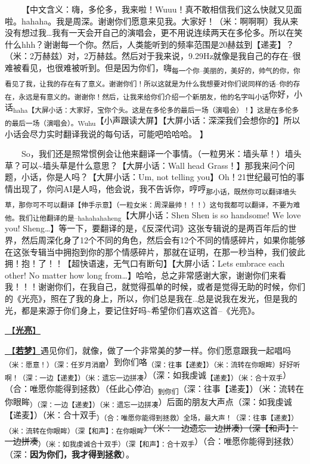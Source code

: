 \documentclass[]{ctexbook}
\begin{document}
  【中文含义：嗨，多伦多，我来啦！Wuuu！真不敢相信我们这么快就又见面啦。hahaha。我是周深。谢谢你们愿意来见我。大家好！（米：啊啊啊）我从来没有想过我\ldots 我有一天会开自己的演唱会，更不用说连续两天在多伦多。所以在笑什么hhh？谢谢每一个你。然后，人类能听到的频率范围是20赫兹到【递麦】？（米：2万赫兹）对，2万赫兹。然后对于我来说，9.29Hz就像是我自己的存在--很难被看见，也很难被听到。但是因为你们，嗨\textsubscript{每一个你--美丽的，美好的，帅气的你，你看见了我，让我的存在有了意义。谢谢你们！所以这就是为什么我想要对你们说同样的话--你的存在，永远是有意义的。谢谢你！然后，让我来给你们介绍一个新朋友，他的名字叫小话}你好，小话\textsubscript{haha【大屏小话：大家好，宝你个头。这是在多伦多的最后一场（演唱会）！】这是在多伦多的最后一场（演唱会）。Wuhu}【小声跟读大屏】【大屏小话：深深我们会想你的】所以小话会尽力实时翻译我说的每句话，可能吧哈哈哈。
】

  So，我们还是照常惯例会让他来翻译一个事情。（一粒男米：墙头草！）墙头草？可以\textasciitilde 墙头草是什么意思？【大屏小话：Wall head Grass！】那我来问个问题，小话，你是人吗？【大屏小话：Um, not telling you】Oh！21世纪最可怕的事情出现了，你问AI是人吗，他会说，我不告诉你，哼哼\textsubscript{那小话，既然你可以翻译墙头草，那你可不可以翻译【伸手示意】（一粒女米：周深最帅！！！）这句我都可以翻译，不要为难他。我们让他翻译的是--hahahahaheng}【大屏小话：Shen Shen is so handsome! We love you! Sheng\ldots】等一下，要翻译的是，《反深代词》这张专辑说的是两百年后的世界，然后周深化身了12个不同的角色，然后会有12个不同的情感碎片，如果你能够在这张专辑当中拥抱到你的那个情感碎片，那就在证明，在那一秒当种，我们彼此拥！抱！了！！【超快语速，无气口有断句】【大屏小话：Lets embrace each other! No matter how long from\ldots】哈哈，总之非常感谢大家，谢谢你们来看我！！！谢谢你们，在我自己，就觉得孤单的时候，或者是觉得无助的时候，你们的《光亮》，照在了我的身上，所以，你们总是我在..总是说我在发光，但是我的光，都是来源于你们身上，要记住好吗\textasciitilde 希望你们喜欢这首--《光亮》。

\hyperref[silver-linings]{🎵【\textbf{光亮}】}

\hyperref[ruomeng]{🎵【\textbf{若梦}】}遇见你们，就像，做了一个非常美的梦一样。你们愿意跟我一起唱吗\textsubscript{（米：愿意！）（深：任岁月消磨}）到你们咯\textsubscript{（深：往事【递麦】）（米：流转在你眼眸）好好听啊！（深：一边【递麦】）（米：遗忘一边拼凑}）（深：如我虔诚\textsubscript{【递麦】）（米：合十双手}）（合：唯愿你能得到拯救）（任此心停泊\textsubscript{）到你们}（深：往事【递麦】）（米：流转在你眼眸\textsubscript{）（深：一边【递麦】）（米：遗忘一边拼凑}）后面的朋友大声点（深：如我虔诚【递麦】）（米：合十双手\textsubscript{）（合：唯愿你能得到拯救）全场，最大声！（深：往事【递麦】）（米：流转在你眼眸）（深【和声】：在你眼眸}\st{）（米：一边遗忘一边拼凑）（深【和声】：一边拼凑}\textsubscript{）（米：如我虔诚合十双手）（深【和声】：合十双手}）（合：唯愿你能得到拯救）（深：\textbf{因为你们，我才得到拯救}）。
\end{document}
